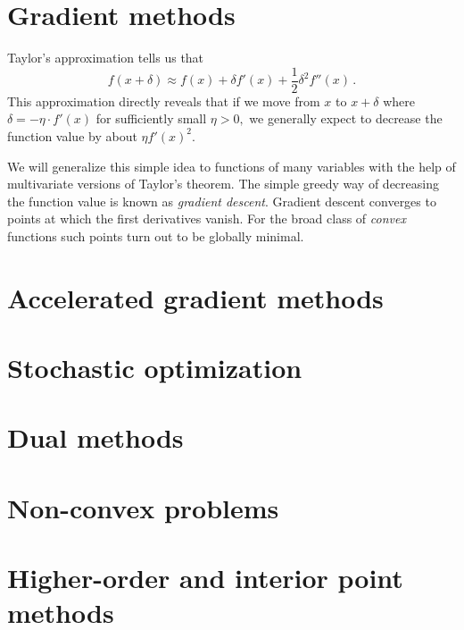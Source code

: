 \documentclass[12pt]{article}
\begin{document}
\maketitle



\pagebreak

\setcounter{tocdepth}{2}
\tableofcontents

\pagebreak

\part{Gradient methods}
\label{part:basic}

Taylor's approximation tells us that
\[
f(x+\delta)\approx f(x) + \delta f'(x) + \frac 12 \delta^2 f''(x)\,.
\]
This approximation directly reveals that if we move from $x$ to $x+\delta$ where
$\delta=-\eta \cdot f'(x)$ for sufficiently small $\eta>0,$ we generally expect
to decrease the function value by about $\eta f'(x)^2.$ 

We will generalize this simple idea to functions of many variables with the help
of multivariate versions of Taylor's theorem. The simple greedy way of
decreasing the function value is known as \emph{gradient descent}. Gradient
descent converges to points at which the first derivatives vanish. For the broad
class of \emph{convex} functions such points turn out to be globally minimal.







\part{Accelerated gradient methods}
\label{part:accelerated}





\part{Stochastic optimization}
\label{part:stochastic}




\part{Dual methods}
\label{part:dual}




\part{Non-convex problems}
\label{part:nonconvex}





\part{Higher-order and interior point methods}
\label{part:higher}







\end{document}
